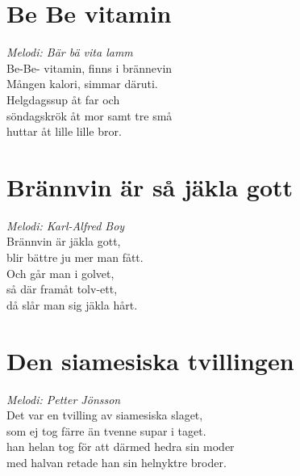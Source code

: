 \section{Be Be vitamin}
\textit{Melodi: Bär bä vita lamm}
\vspace{2mm}\\
Be-Be- vitamin, finns i brännevin\\
Mången kalori, simmar däruti.\\
Helgdagssup åt far och\\
söndagskrök åt mor samt tre små\\
huttar åt lille lille bror.\\

\section{Brännvin är så jäkla gott}
\textit{Melodi: Karl-Alfred Boy}
\vspace{2mm}\\
Brännvin är jäkla gott,\\
blir bättre ju mer man fått.\\
Och går man i golvet,\\
så där framåt tolv-ett,\\
då slår man sig jäkla hårt.\\

\section{Den siamesiska tvillingen}
\textit{Melodi: Petter Jönsson}
\vspace{2mm}\\
Det var en tvilling av siamesiska slaget,\\
som ej tog färre än tvenne supar i taget.\\
han helan tog för att därmed hedra sin moder\\
med halvan retade han sin helnyktre broder.\\
